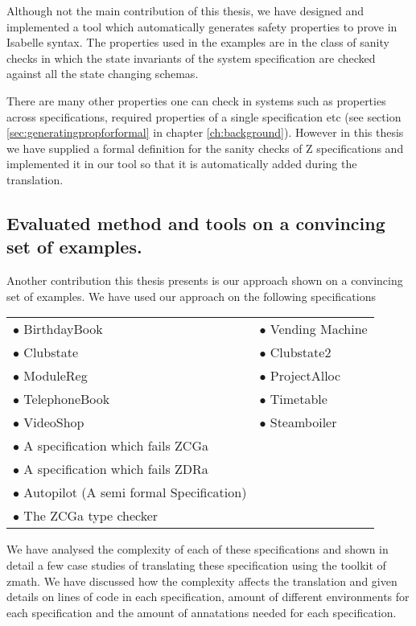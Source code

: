 Although not the main contribution of this thesis, we have designed and implemented a tool which automatically generates safety properties to prove in Isabelle syntax. The properties used in the examples are in the class of sanity checks in which the state invariants of the system specification are checked against all the state changing schemas.

There are many other properties one can check in systems such as properties across specifications, required properties of a single specification etc (see section \ref{sec:generatingpropforformal} in chapter \ref{ch:background}). However in this thesis we have supplied a formal definition for the sanity checks of Z specifications and implemented it in our tool so that it is automatically added during the translation.


\subsection{Evaluated method and tools on a convincing set of examples.}

Another contribution this thesis presents is our approach shown on a convincing set of examples. We have used our approach on the following specifications

\begin{tabular}{l l}
$\bullet$ BirthdayBook \cite{spiveyreferencemanual} & $\bullet$ Vending Machine \cite{pp} \\
$\bullet$ Clubstate \cite{essenceofz} & $\bullet$ Clubstate2 \cite{essenceofz} \\
$\bullet$ ModuleReg \cite{essenceofz} & $\bullet$ ProjectAlloc \cite{essenceofz} \\
$\bullet$ TelephoneBook & $\bullet$ Timetable \cite{essenceofz} \\
$\bullet$ VideoShop \cite{essenceofz} & $\bullet$ Steamboiler \cite{steamboilerslides} \\
$\bullet$ A specification which fails ZCGa & \\
$\bullet$ A specification which fails ZDRa & \\
$\bullet$ Autopilot (A semi formal Specification) \cite{Butler96} & \\
$\bullet$ The ZCGa type checker & \\
\end{tabular}

We have analysed the complexity of each of these specifications and shown in detail a few case studies of translating these specification using the toolkit of \gls{zmath}. We have discussed how the complexity affects the translation and given details on lines of code in each specification, amount of different environments for each specification and the amount of annatations needed for each specification.

